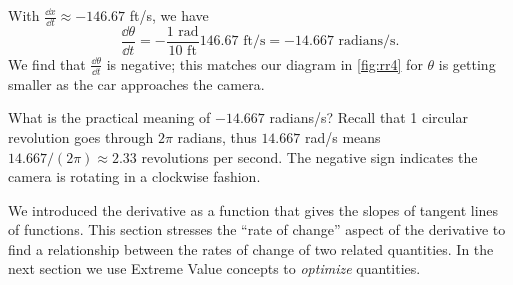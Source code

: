 \begin{example}
With $\frac{\dd x}{\dd t} \approx -146.67$ ft/s, we have
\[
 \frac{\dd\theta}{\dd t}
 = -\frac{1\text{ rad}}{10\text{ ft}}146.67\text{ ft/s}
 = -14.667\text{ radians/s}.
\]
We find that $\frac{\dd\theta}{\dd t}$ is negative; this matches our diagram in \autoref{fig:rr4} for $\theta$ is getting smaller as the car approaches the camera.	
	
What is the practical meaning of $-14.667$ radians/s? Recall that 1 circular revolution goes through $2\pi$ radians, thus $14.667$ rad/s means $14.667/(2\pi)\approx 2.33$ revolutions per second. The negative sign indicates the camera is rotating in a clockwise fashion.
\end{example}


We introduced the derivative as a function that gives the slopes of tangent lines of functions. This 
section stresses the ``rate of change'' aspect of the derivative to find a relationship between the rates of change of two related quantities. 
In the next section we use Extreme Value concepts to \emph{optimize} quantities. 


